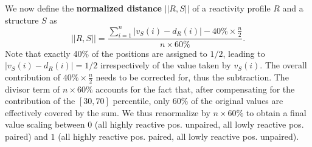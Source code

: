 \documentclass[11pt]{article} %
\begin{document}
We now define the {\bf normalized distance} $||R,S||$ of a reactivity profile $R$ and a structure $S$ as
$$ ||R,S|| = \frac{\sum_{i=1}^n |v_S(i)-d_R(i)|-40\%\times \frac{n}{2}}{n\times 60\%}.$$
Note that exactly 40\% of the positions are assigned to $1/2$, leading to $|v_S(i)-d_R(i)|=1/2$ irrespectively of the value taken by $v_S(i)$. The overall contribution of $40\%\times \frac{n}{2}$ needs to be corrected for, thus the subtraction. The divisor term of $n\times 60\%$ accounts for the fact that, after compensating for the contribution of the $[30,70]$ percentile, only $60\%$ of the original values are effectively covered by the sum. We thus renormalize by $n\times 60\%$ to obtain a final value scaling between $0$ (all highly reactive pos. unpaired, all lowly reactive pos. paired) and $1$ (all highly reactive pos. paired, all lowly reactive pos. unpaired).
\end{document}
